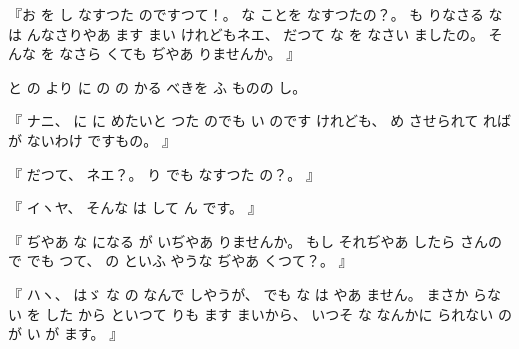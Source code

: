 %
『お
を
し
なすつた
のですつて！。
%
な
ことを
なすつたの？。
%
も
りなさる
な
は
んなさりやあ
ます
まい
けれどもネエ、
%
だつて
な
を
なさい
ましたの。
%
そんな
を
なさら
くても
ぢやあ
りませんか。
』

%
と
の
より
に
の
の
かる
べきを
ふ
ものの
し。

%
『
ナニ、
%
に
に
めたいと
つた
のでも
い
のです
けれども、
%
め
させられて
れば
が
ないわけ
ですもの。
』

%
『
だつて、
%
ネエ？。
%
り
でも
なすつた
の？。
』

%
『
イヽヤ、
%
そんな
は
して
ん
です。
』

%
『
ぢやあ
な
になる
が
いぢやあ
りませんか。
%
もし
それぢやあ
したら
さんの
で
でも
つて、
%
の
といふ
やうな
ぢやあ
くつて？。
』

%
『
ハヽ、
%
はゞ
な
の
なんで
しやうが、
%
でも
な
は
やあ
ません。
%
まさか
らない
を
した
から
といつて
りも
ます
まいから、
%
いつそ
な
なんかに
られない
の
が
い
が
ます。
』

